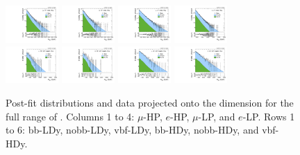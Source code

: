 \begin{figure}[htbp]
  \includegraphics[width=0.18\textwidth]{fig/fitValidation/PostFit_SR_MVV__mu_HP_nobb_HDy_Run2.pdf}
  \includegraphics[width=0.18\textwidth]{fig/fitValidation/PostFit_SR_MVV__e_HP_nobb_HDy_Run2.pdf}
  \includegraphics[width=0.18\textwidth]{fig/fitValidation/PostFit_SR_MVV__mu_LP_nobb_HDy_Run2.pdf}
  \includegraphics[width=0.18\textwidth]{fig/fitValidation/PostFit_SR_MVV__e_LP_nobb_HDy_Run2.pdf}\\
  \includegraphics[width=0.18\textwidth]{fig/fitValidation/PostFit_SR_MVV__mu_HP_vbf_HDy_Run2.pdf}
  \includegraphics[width=0.18\textwidth]{fig/fitValidation/PostFit_SR_MVV__e_HP_vbf_HDy_Run2.pdf}
  \includegraphics[width=0.18\textwidth]{fig/fitValidation/PostFit_SR_MVV__mu_LP_vbf_HDy_Run2.pdf}
  \includegraphics[width=0.18\textwidth]{fig/fitValidation/PostFit_SR_MVV__e_LP_vbf_HDy_Run2.pdf}\\
  \caption{
    Post-fit distributions and data projected onto the \MVV dimension for the full range of \MJ.
    Columns 1 to 4: $\mu$-HP, $e$-HP, $\mu$-LP, and $e$-LP.
    Rows 1 to 6: bb-LDy, nobb-LDy, vbf-LDy, bb-HDy, nobb-HDy, and vbf-HDy.
  }
  \label{fig:postfit_MVV_Run2}
\end{figure}

